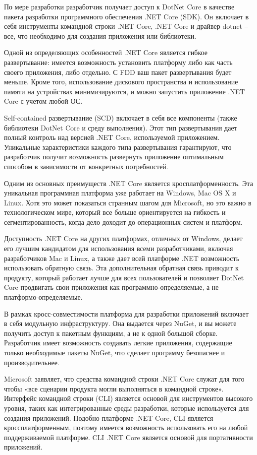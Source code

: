 По мере разработки разработчик получает доступ к DotNet Core в качестве пакета разработки программного обеспечения .NET Core (SDK). Он включает в себя инструменты командной строки .NET Core, .NET Core и драйвер dotnet – все, что необходимо для создания приложения или библиотеки.

Одной из определяющих особенностей .NET Core является гибкое развертывание: имеется возможность установить платформу либо как часть своего приложения, либо отдельно. С FDD ваш пакет развертывания будет меньше. Кроме того, использование дискового пространства и использование памяти на устройствах минимизируются, и можно запустить приложение .NET Core с учетом любой ОС.

Self-contained развертывание (SCD) включает в себя все компоненты (также библиотеки DotNet Core и среду выполнения). Этот тип развертывания дает полный контроль над версией .NET Core, используемой приложением. Уникальные характеристики каждого типа развертывания гарантируют, что разработчик получит возможность развернуть приложение оптимальным способом в зависимости от конкретных потребностей.

Одним из основных преимуществ .NET Core является кросплатформенность. Эта уникальная программная платформа уже работает на \linebreak Windows, Mac OS X и Linux. Хотя это может показаться странным шагом для Microsoft, но это важно в технологическом мире, который все больше ориентируется на гибкость и сегментированность, когда дело доходит до операционных систем и платформ.

Доступность .NET Core на других платформах, отличных от Windows, делает его лучшим кандидатом для использования всеми разработчиками, включая разработчиков Mac и Linux, а также дает всей платформе .NET возможность использовать обратную связь. Эта дополнительная обратная связь приводит к продукту, который работает лучше для всех пользователей и позволяет DotNet Core продвигать свои приложения как программно-определяемые, а не платформо-определяемые.

В рамках кросс-совместимости платформа для разработки приложений включает в себя модульную инфраструктуру. Она выдается через NuGet, и вы можете получить доступ к пакетным функциям, а не к одной большой сборке. Разработчик имеет возможность создавать легкие приложения, содержащие только необходимые пакеты NuGet, что сделает программу безопаснее и производительнее.

Microsoft заявляет, что средства командной строки .NET Core служат для того чтобы «все сценарии продукта могли выполняться в командной строке». Интерфейс командной строки (CLI) является основой для инструментов высокого уровня, таких как интегрированные среды разработки, которые используется для создания приложений. Подобно платформе .NET Core, CLI является кроссплатформенным, поэтому имеется возможность использовать его на любой поддерживаемой платформе. CLI .NET Core является основой для портативности приложений.


